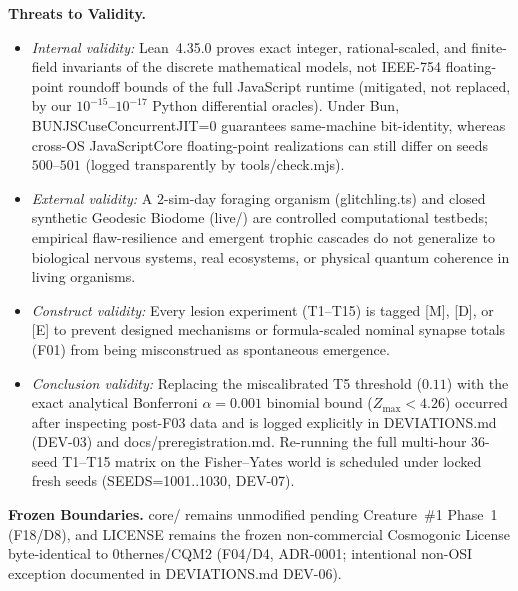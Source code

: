 \documentclass[11pt,a4paper]{article}
\numberwithin{equation}{section}
\theoremstyle{plain}
\theoremstyle{definition}
\theoremstyle{remark}
\newcommand{\code}[1]{{\ttfamily\footnotesize\def\_{\textunderscore\penalty0\hskip0pt}#1}}
\begin{document}
\textbf{Threats to Validity.}
\begin{itemize}[leftmargin=1.6em,itemsep=1pt]
  \item \emph{Internal validity:} Lean~4.35.0 proves exact integer, rational-scaled, and finite-field invariants of the discrete mathematical models, not IEEE-754 floating-point roundoff bounds of the full JavaScript runtime (mitigated, not replaced, by our $10^{-15}$--$10^{-17}$ Python differential oracles). Under Bun, \code{BUN\_JSC\_useConcurrentJIT=0} guarantees same-machine bit-identity, whereas cross-OS JavaScriptCore floating-point realizations can still differ on seeds $500$--$501$ (logged transparently by \code{tools/check.mjs}).
  \item \emph{External validity:} A $2$-sim-day foraging organism (\code{glitchling.ts}) and closed synthetic Geodesic Biodome (\code{live/}) are controlled computational testbeds; empirical flaw-resilience and emergent trophic cascades do not generalize to biological nervous systems, real ecosystems, or physical quantum coherence in living organisms.
  \item \emph{Construct validity:} Every lesion experiment (\code{T1--T15}) is tagged \code{[M]}, \code{[D]}, or \code{[E]} to prevent designed mechanisms or formula-scaled nominal synapse totals (\code{F01}) from being misconstrued as spontaneous emergence.
  \item \emph{Conclusion validity:} Replacing the miscalibrated \code{T5} threshold ($0.11$) with the exact analytical Bonferroni $\alpha=0.001$ binomial bound ($Z_{\max} < 4.26$) occurred after inspecting post-\code{F03} data and is logged explicitly in \code{DEVIATIONS.md} (\code{DEV-03}) and \code{docs/preregistration.md}. Re-running the full multi-hour $36$-seed \code{T1--T15} matrix on the Fisher--Yates world is scheduled under locked fresh seeds (\code{SEEDS=1001..1030}, \code{DEV-07}).
\end{itemize}

\textbf{Frozen Boundaries.} \code{core/} remains unmodified pending Creature~\#1 Phase~1 (\code{F18/D8}), and \code{LICENSE} remains the frozen non-commercial Cosmogonic License byte-identical to \code{0thernes/CQM2} (\code{F04/D4}, \code{ADR-0001}; intentional non-OSI exception documented in \code{DEVIATIONS.md} \code{DEV-06}).
\end{document}
